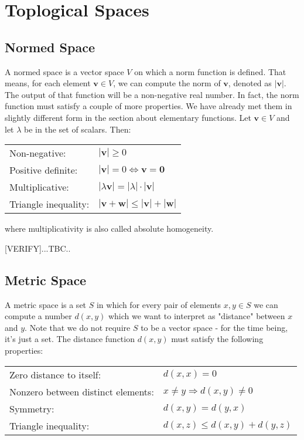 \section{Toplogical Spaces}

\subsection{Normed Space}
A normed space is a vector space $V$ on which a norm function is defined. That means, for each element $\mathbf{v} \in V$, we can compute the norm of $\mathbf{v}$, denoted as $|\mathbf{v}|$. The output of that function will be a non-negative real number. In fact, the norm function must satisfy a couple of more properties. We have already met them in slightly different form in the section about elementary functions. Let $\mathbf{v} \in V$ and let $\lambda$ be in the set of scalars. Then:

\medskip
\begin{tabular}{l l}
Non-negative:         & $|\mathbf{v}| \geq 0$  \\
Positive definite:    & $|\mathbf{v}| = 0 \Leftrightarrow \mathbf{v} = \mathbf{0}$  \\
Multiplicative:       & $|\lambda \mathbf{v}| = |\lambda| \cdot |\mathbf{v}|$  \\
Triangle inequality:  & $|\mathbf{v} + \mathbf{w}| \leq |\mathbf{v}| + |\mathbf{w}| $
\end{tabular}
\medskip

where multiplicativity is also called absolute homogeneity.

[VERIFY]...TBC..



\subsection{Metric Space}
A metric space is a set $S$ in which for every pair of elements $x,y \in S$ we can compute a number $d(x,y)$ which we want to interpret as "distance" between $x$ and $y$. Note that we do not require $S$ to be a vector space - for the time being, it's just a set. The distance function $d(x,y)$ must satisfy the following properties:

\medskip
\begin{tabular}{l l}
Zero distance to itself:           & $d(x, x) = 0$  \\
Nonzero between distinct elements: & $x \neq y \Rightarrow d(x,y) \neq 0$  \\
Symmetry:                          & $d(x, y) = d(y, x)$  \\
Triangle inequality:               & $d(x,z) \leq d(x,y) + d(y,z)$
\end{tabular}
\medskip

